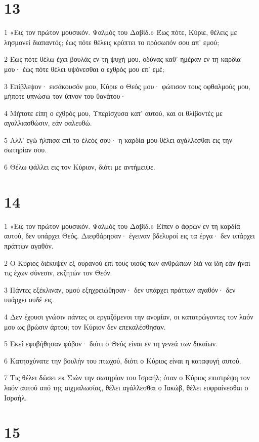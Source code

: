 \chapter{13}

\par 1 «Εις τον πρώτον μουσικόν. Ψαλμός του Δαβίδ.» Έως πότε, Κύριε, θέλεις με λησμονεί διαπαντός; έως πότε θέλεις κρύπτει το πρόσωπόν σου απ' εμού;
\par 2 Έως πότε θέλω έχει βουλάς εν τη ψυχή μου, οδύνας καθ' ημέραν εν τη καρδία μου· έως πότε θέλει υψόνεσθαι ο εχθρός μου επ' εμέ;
\par 3 Επίβλεψον· εισάκουσόν μου, Κύριε ο Θεός μου· φώτισον τους οφθαλμούς μου, μήποτε υπνώσω τον ύπνον του θανάτου·
\par 4 Μήποτε είπη ο εχθρός μου, Υπερίσχυσα κατ' αυτού, και οι θλίβοντές με αγαλλιασθώσιν, εάν σαλευθώ.
\par 5 Αλλ' εγώ ήλπισα επί το έλεός σου· η καρδία μου θέλει αγάλλεσθαι εις την σωτηρίαν σου.
\par 6 Θέλω ψάλλει εις τον Κύριον, διότι με αντήμειψε.

\chapter{14}

\par 1 «Εις τον πρώτον μουσικόν. Ψαλμός του Δαβίδ.» Είπεν ο άφρων εν τη καρδία αυτού, δεν υπάρχει Θεός. Διεφθάρησαν· έγειναν βδελυροί εις τα έργα· δεν υπάρχει πράττων αγαθόν.
\par 2 Ο Κύριος διέκυψεν εξ ουρανού επί τους υιούς των ανθρώπων διά να ίδη εάν ήναι τις έχων σύνεσιν, εκζητών τον Θεόν.
\par 3 Πάντες εξέκλιναν, ομού εξηχρειώθησαν· δεν υπάρχει πράττων αγαθόν· δεν υπάρχει ουδέ εις.
\par 4 Δεν έχουσι γνώσιν πάντες οι εργαζόμενοι την ανομίαν, οι κατατρώγοντες τον λαόν μου ως βρώσιν άρτου; τον Κύριον δεν επεκαλέσθησαν.
\par 5 Εκεί εφοβήθησαν φόβον· διότι ο Θεός είναι εν τη γενεά των δικαίων.
\par 6 Κατησχύνατε την βουλήν του πτωχού, διότι ο Κύριος είναι η καταφυγή αυτού.
\par 7 Τις θέλει δώσει εκ Σιών την σωτηρίαν του Ισραήλ; όταν ο Κύριος επιστρέψη τον λαόν αυτού από της αιχμαλωσίας, θέλει αγάλλεσθαι ο Ιακώβ, θέλει ευφραίνεσθαι ο Ισραήλ.

\chapter{15}

